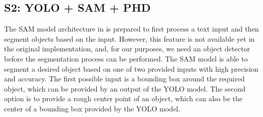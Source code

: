 \subsection{S2: YOLO + SAM + PHD}
The SAM model architecture in \cite{SAM2023} is prepared to first process a text input and then segment objects based
on the
input. However, this feature is not available yet in the original implementation, and, for our purposes, we need an
object
detector before the segmentation process can be performed. The SAM model is able to segment a desired object based on
one
of two provided
inputs with high precision and accuracy. The first possible input is a bounding box around the required object, which
can be provided by an output of the YOLO model. The second option is to provide a rough center point of an object, which
can also be the center of a bounding box provided by the YOLO model.

